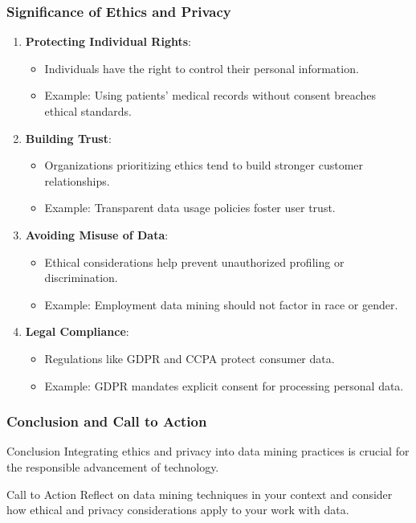 \documentclass{beamer}
\begin{document}
\begin{frame}[fragile]
    \frametitle{Significance of Ethics and Privacy}
    \begin{enumerate}
        \item \textbf{Protecting Individual Rights}:
            \begin{itemize}
                \item Individuals have the right to control their personal information.
                \item Example: Using patients' medical records without consent breaches ethical standards.
            \end{itemize}
            
        \item \textbf{Building Trust}:
            \begin{itemize}
                \item Organizations prioritizing ethics tend to build stronger customer relationships.
                \item Example: Transparent data usage policies foster user trust.
            \end{itemize}
            
        \item \textbf{Avoiding Misuse of Data}:
            \begin{itemize}
                \item Ethical considerations help prevent unauthorized profiling or discrimination.
                \item Example: Employment data mining should not factor in race or gender.
            \end{itemize}
            
        \item \textbf{Legal Compliance}:
            \begin{itemize}
                \item Regulations like GDPR and CCPA protect consumer data.
                \item Example: GDPR mandates explicit consent for processing personal data.
            \end{itemize}
    \end{enumerate}
\end{frame}

\begin{frame}[fragile]
    \frametitle{Conclusion and Call to Action}
    \begin{block}{Conclusion}
        Integrating ethics and privacy into data mining practices is crucial for the responsible advancement of technology.
    \end{block}
    \begin{block}{Call to Action}
        Reflect on data mining techniques in your context and consider how ethical and privacy considerations apply to your work with data.
    \end{block}
\end{frame}
\end{document}

